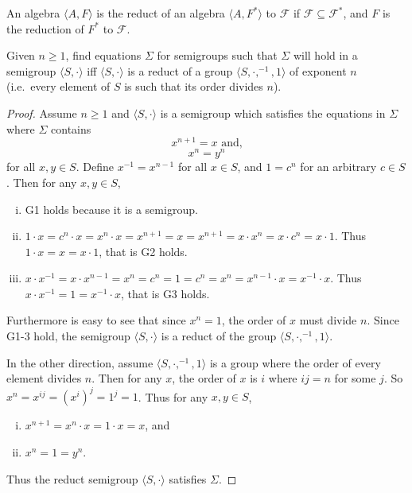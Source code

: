 
\begin{definition*}
An algebra $\langle A, F\rangle$ is the reduct of an algebra $\langle A, F^*\rangle$ to $\mathcal{F}$ if $\mathcal{F}\subseteq\mathcal{F^*}$, and $F$ is the reduction of $F^*$ to $\mathcal{F}$.
\end{definition*}

\begin{theorem*}
Given $n\geq 1$, find equations $\Sigma$ for semigroups such that $\Sigma$ will hold in a semigroup $\langle S, \cdot \rangle$ iff $\langle S, \cdot \rangle$ is a reduct of a group $\langle S, \cdot, ^{-1}, 1 \rangle$ of exponent $n$ (i.e.\ every element of $S$ is such that its order divides $n$).
\end{theorem*}

\begin{proof}
Assume $n\geq 1$ and $\langle S, \cdot\rangle$ is a semigroup which satisfies the equations in $\Sigma$ where $\Sigma$ contains
\[
  x^{n+1} = x \text{ and,}
\]
\[
  x^n = y^n
\]
for all $x,y\in S$.
Define $x^{-1} = x^{n - 1}$ for all $x \in S$, and $1 = c^n$ for an arbitrary $c\in S$.
Then for any $x, y \in S$,
\begin{enumerate}[(i)]
  \item G1 holds because it is a semigroup.
  \item 
    $1\cdot x = c^n \cdot x = x^n \cdot x = x^{n+1} = x = x^{n+1} = x\cdot x^n = x \cdot c^n = x \cdot 1$.
    Thus $1\cdot x = x = x \cdot 1$, that is G2 holds.
  \item
    $x\cdot x^{-1} = x \cdot x^{n-1} = x^n = c^n = 1 = c^n = x^n = x^{n-1} \cdot x = x^{-1} \cdot x$.
    Thus $x\cdot x^{-1} = 1 = x^{-1} \cdot x$, that is G3 holds.
\end{enumerate}
Furthermore is easy to see that since $x^n = 1$, the order of $x$ must divide $n$.
Since G1-3 hold, the semigroup $\langle S, \cdot\rangle$ is a reduct of the group $\langle S, \cdot, ^{-1}, 1 \rangle$.

In the other direction, assume $\langle S, \cdot, ^{-1}, 1 \rangle$ is a group where the order of every element divides $n$.
Then for any $x$, the order of $x$ is $i$ where $ij=n$ for some $j$.
So $x^n = x^{ij} = (x^i)^j = 1^j = 1$.
Thus for any $x, y \in S$,
\begin{enumerate}[(i)]
  \item $x^{n+1} = x^{n}\cdot x = 1 \cdot x = x$, and
  \item $x^n = 1 = y^n$.
\end{enumerate}
Thus the reduct semigroup $\langle S, \cdot\rangle$ satisfies $\Sigma$.
\end{proof}
